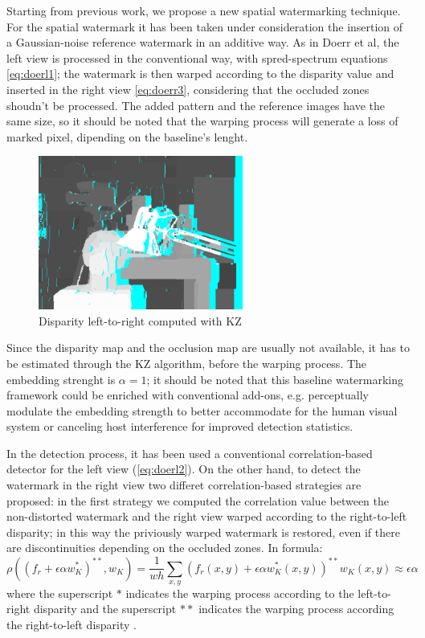 Starting from previous work, we propose a new spatial watermarking technique. \newline
For the spatial watermark it has been taken under consideration the insertion of a Gaussian-noise reference watermark in an additive way.\newline
As in Doerr et al, the left view is processed in the conventional way, with spred-spectrum equations \ref{eq:doerl1}; the watermark is then warped according to the disparity value and inserted in the right view \ref{eq:doerr3}, considering that the occluded zones shoudn't be processed.\newline
The added pattern and the reference images have the same size, so it should be noted that the warping process will generate a loss of marked pixel, dipending on the baseline's lenght.\newline
\begin{figure}[h!]
\centering
\includegraphics[width=0.6\textwidth]{./img/disp_left_to_right.png}
\caption{\small{Disparity left-to-right computed with KZ}}
\label{fig:kzdisplr}
\end{figure}
Since the disparity map and the occlusion map are usually not available, it has to be estimated through the KZ algorithm, before the warping process.\newline
The embedding strenght is $\alpha=1$; it should be noted that this baseline watermarking framework could be enriched with conventional add-ons, e.g. perceptually modulate the embedding strength to better accommodate for the human visual system or canceling host interference for improved detection statistics.\newline

In the detection process, it has been used a conventional correlation-based detector for the left view (\ref{eq:doerl2}).\newline 
On the other hand, to detect the watermark in the right view two differet correlation-based strategies are proposed:
in the first strategy we computed the correlation value between the non-distorted watermark and the right view warped according to the right-to-left disparity; in this way the priviously warped watermark is restored, even if there are discontinuities depending on the occluded zones. In formula:
$$\rho((f_{r}+\epsilon\alpha w_{K}^{*})^{**},w_{K})= \frac{1}{wh}\sum_{x,y}(f_{r}(x,y)+\epsilon\alpha w_{K}^{*}(x,y))^{**}w_{K}(x,y)\approx\epsilon\alpha $$
where the superscript $*$ indicates the warping process according to the left-to-right disparity and the superscript $**$ indicates the warping process according the right-to-left disparity .\newline

